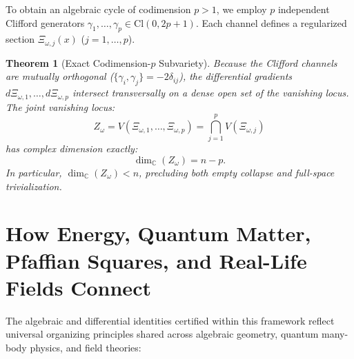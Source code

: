 \documentclass[11pt,a4paper]{article}
\newtheorem{theorem}{Theorem}[section]
\theoremstyle{definition}
\begin{document}
To obtain an algebraic cycle of codimension $p > 1$, we employ $p$ independent Clifford generators $\gamma_1, \dots, \gamma_p \in \mathrm{Cl}(0, 2p+1)$.
Each channel defines a regularized section $\Xi_{\omega, j}(x)$ ($j = 1, \dots, p$).
\begin{theorem}[Exact Codimension-$p$ Subvariety]
Because the Clifford channels are mutually orthogonal ($\{\gamma_i, \gamma_j\} = -2\delta_{ij}$), the differential gradients $d\Xi_{\omega, 1}, \dots, d\Xi_{\omega, p}$ intersect transversally on a dense open set of the vanishing locus. The joint vanishing locus:
\begin{equation}
  Z_\omega = V(\Xi_{\omega, 1}, \dots, \Xi_{\omega, p}) = \bigcap_{j=1}^p V(\Xi_{\omega, j})
\end{equation}
has complex dimension exactly:
\begin{equation}
  \dim_{\mathbb{C}}(Z_\omega) = n - p.
\end{equation}
In particular, $\dim_{\mathbb{C}}(Z_\omega) < n$, precluding both empty collapse and full-space trivialization.
\end{theorem}


\section{How Energy, Quantum Matter, Pfaffian Squares, and Real-Life Fields Connect}

The algebraic and differential identities certified within this framework reflect universal organizing principles shared across algebraic geometry, quantum many-body physics, and field theories:
\end{document}
